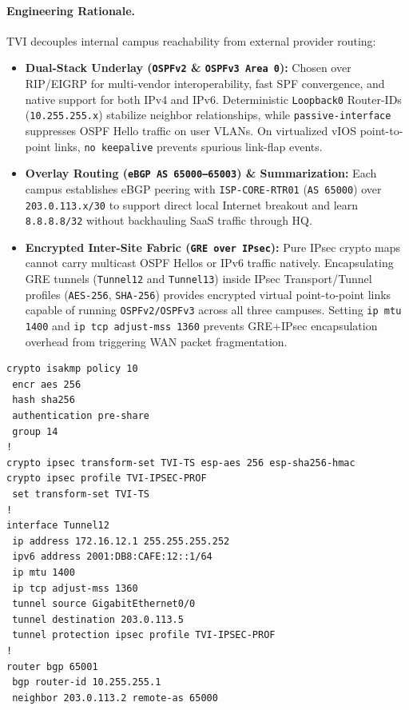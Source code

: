 \paragraph{Engineering Rationale.}
TVI decouples internal campus reachability from external provider routing:
\begin{itemize}[leftmargin=1.5em, itemsep=2pt]
    \item \textbf{Dual-Stack Underlay (\texttt{OSPFv2} \& \texttt{OSPFv3 Area 0}):} Chosen over RIP/EIGRP for multi-vendor interoperability, fast SPF convergence, and native support for both IPv4 and IPv6. Deterministic \texttt{Loopback0} Router-IDs (\texttt{10.255.255.x}) stabilize neighbor relationships, while \texttt{passive-interface} suppresses OSPF Hello traffic on user VLANs. On virtualized vIOS point-to-point links, \texttt{no keepalive} prevents spurious link-flap events.
    \item \textbf{Overlay Routing (\texttt{eBGP AS 65000--65003}) \& Summarization:} Each campus establishes eBGP peering with \texttt{ISP-CORE-RTR01} (\texttt{AS 65000}) over \texttt{203.0.113.x/30} to support direct local Internet breakout and learn \texttt{8.8.8.8/32} without backhauling SaaS traffic through HQ.
    \item \textbf{Encrypted Inter-Site Fabric (\texttt{GRE over IPsec}):} Pure IPsec crypto maps cannot carry multicast OSPF Hellos or IPv6 traffic natively. Encapsulating GRE tunnels (\texttt{Tunnel12} and \texttt{Tunnel13}) inside IPsec Transport/Tunnel profiles (\texttt{AES-256}, \texttt{SHA-256}) provides encrypted virtual point-to-point links capable of running \texttt{OSPFv2/OSPFv3} across all three campuses. Setting \texttt{ip mtu 1400} and \texttt{ip tcp adjust-mss 1360} prevents GRE+IPsec encapsulation overhead from triggering WAN packet fragmentation.
\end{itemize}

\begin{lstlisting}[style=CiscoCLI, caption={GRE over IPsec VPN Profile and eBGP Peering Pattern on HCMC-EDGE-RTR01.}]
crypto isakmp policy 10
 encr aes 256
 hash sha256
 authentication pre-share
 group 14
!
crypto ipsec transform-set TVI-TS esp-aes 256 esp-sha256-hmac
crypto ipsec profile TVI-IPSEC-PROF
 set transform-set TVI-TS
!
interface Tunnel12
 ip address 172.16.12.1 255.255.255.252
 ipv6 address 2001:DB8:CAFE:12::1/64
 ip mtu 1400
 ip tcp adjust-mss 1360
 tunnel source GigabitEthernet0/0
 tunnel destination 203.0.113.5
 tunnel protection ipsec profile TVI-IPSEC-PROF
!
router bgp 65001
 bgp router-id 10.255.255.1
 neighbor 203.0.113.2 remote-as 65000
\end{lstlisting}
